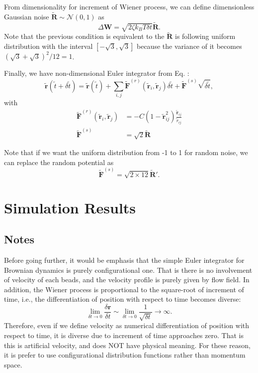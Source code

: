 \message{ !name(brief_Brownian_dynamics.tex)}\documentclass[10pt, a4paper]{report}
\begin{document}
From dimensionality for increment of Wiener process, we can define dimensionless Gaussian noise $\tilde{\mathbf{R}}\sim\mathscr{N}(0,1)$  as
\begin{equation}
\Delta \mathbf{W} = \sqrt{2\zeta k_BT\delta t}\tilde{\mathbf{R}}.
\end{equation}
Note that the previous condition is equivalent to the $\tilde{\mathbf{R}}$ is following uniform distribution with the interval $[-\sqrt{3}, \sqrt{3}]$ because the variance of it becomes $(\sqrt{3}+\sqrt{3})^2/12 = 1$. 

Finally, we have non-dimensional Euler integrator from Eq. \label{eq:update_position}:
\begin{equation}
\tilde{\mathbf{r}}(\tilde{t} + \delta \tilde{t}) = \tilde{\mathbf{r}}(\tilde{t}) + \sum_{i,j}\tilde{\mathbf{F}}^{(r)}(\tilde{\mathbf{r}}_i, \tilde{\mathbf{r}}_j)\delta \tilde{t} + \tilde{\mathbf{F}}^{(s)}\sqrt{\delta\tilde{t}},
\end{equation}
with
\begin{align}
\tilde{\mathbf{F}}^{(r)}(\tilde{\mathbf{r}}_i, \tilde{\mathbf{r}}_j) &= -C\left(1-\tilde{\mathbf{r}}_{ij}^2\right)\frac{\tilde{\mathbf{r}}_{ij}}{\tilde{r}_{ij}}\\
\tilde{\mathbf{F}}^{(s)} &= \sqrt{2}\tilde{\mathbf{R}}
\end{align}

Note that if we want the uniform distribution from -1 to 1 for random noise, we can replace the random potential as
\begin{equation}
\tilde{\mathbf{F}}^{(s)} = \sqrt{2\times 12}\tilde{\mathbf{R}}'.
\end{equation}

\section{Simulation Results}
\subsection{Notes}
Before going further, it would be emphasis that the simple Euler integrator for Brownian dynamics is purely configurational one. That is there is no involvement of velocity of each beads, and the velocity profile is purely given by flow field. In addition, the Wiener process is proportional to the square-root of increment of time, i.e., the differentiation of position with respect to time becomes diverse:
\begin{equation}
\lim_{\delta t\to 0}\frac{\delta \mathbf{r}}{\delta t} \sim \lim_{\delta t\to 0} \frac{1}{\sqrt{\delta t}} \to \infty.
\end{equation}
Therefore, even if we define velocity as numerical differentiation of position with respect to time, it is diverse due to increment of time approaches zero. That is this is artificial velocity, and does NOT have physical meaning.
For these reason, it is prefer to use configurational distribution functions rather than momentum space.
\end{document}
